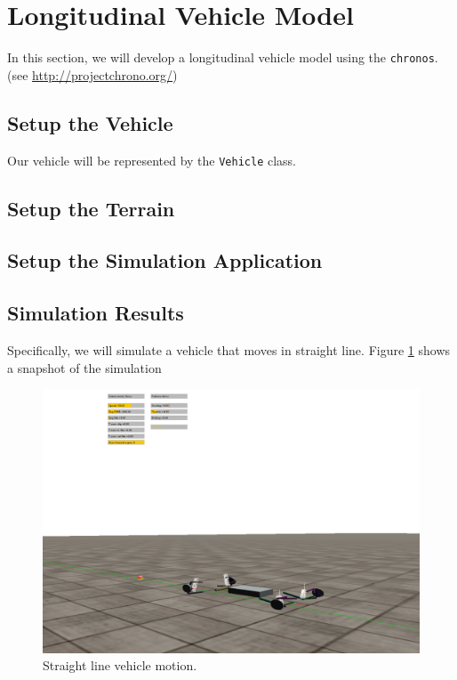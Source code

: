 \section{Longitudinal Vehicle Model}
\label{longitudinal_vehicle_model}

In this section, we will develop a longitudinal vehicle model using the  \lstinline{chronos}.
(see \url{http://projectchrono.org/})



\subsection{Setup the Vehicle}

Our vehicle will be represented by the \lstinline{Vehicle} class.
\subsection{Setup the Terrain}


\subsection{Setup the Simulation Application}


\subsection{Simulation Results}

 
Specifically, we will simulate a vehicle that moves in straight line.  Figure \ref{straight_line_motion} shows a snapshot of the simulation

\begin{figure}[!htb]
\begin{center}
\includegraphics[scale=0.290]{img/straight_line_motion.png}
\end{center}
\caption{Straight line vehicle motion.}
\label{straight_line_motion}
\end{figure}

